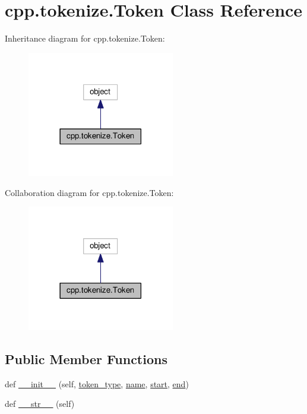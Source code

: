 \hypertarget{classcpp_1_1tokenize_1_1Token}{}\section{cpp.\+tokenize.\+Token Class Reference}
\label{classcpp_1_1tokenize_1_1Token}


Inheritance diagram for cpp.\+tokenize.\+Token\+:
\nopagebreak
\begin{figure}[H]
\begin{center}
\leavevmode
\includegraphics[width=182pt]{classcpp_1_1tokenize_1_1Token__inherit__graph}
\end{center}
\end{figure}


Collaboration diagram for cpp.\+tokenize.\+Token\+:
\nopagebreak
\begin{figure}[H]
\begin{center}
\leavevmode
\includegraphics[width=182pt]{classcpp_1_1tokenize_1_1Token__coll__graph}
\end{center}
\end{figure}
\subsection*{Public Member Functions}
\begin{DoxyCompactItemize}
\item 
def \hyperlink{classcpp_1_1tokenize_1_1Token_a7da7659a5a6c61d0f4b8590cf96e19fd}{\+\_\+\+\_\+init\+\_\+\+\_\+} (self, \hyperlink{classcpp_1_1tokenize_1_1Token_a60c6e5120f3947885f10788ceb69a660}{token\+\_\+type}, \hyperlink{classcpp_1_1tokenize_1_1Token_a90859dd16bde71bc38f717f5119e63b9}{name}, \hyperlink{classcpp_1_1tokenize_1_1Token_a8ec48e348ff29901857cb21553da464b}{start}, \hyperlink{classcpp_1_1tokenize_1_1Token_a9935738c382352eca19834c2533715db}{end})
\item 
def \hyperlink{classcpp_1_1tokenize_1_1Token_a98e024051039637a18601fcbb0232cc2}{\+\_\+\+\_\+str\+\_\+\+\_\+} (self)
\end{DoxyCompactItemize}
